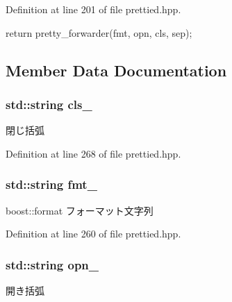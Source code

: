 \-Definition at line 201 of file prettied.\-hpp.


\begin{DoxyCode}
            {
                return pretty_forwarder(fmt, opn, cls, sep);
            }
\end{DoxyCode}


\subsection{\-Member \-Data \-Documentation}
\hypertarget{structyuh_1_1range__detail_1_1pretty__forwarder_ac1750e01b56a52147effe52c4e83e247}{
\subsubsection[{cls\-\_\-}]{\setlength{\rightskip}{0pt plus 5cm}std\-::string {\bf cls\-\_\-}}}\label{db/d79/structyuh_1_1range__detail_1_1pretty__forwarder_ac1750e01b56a52147effe52c4e83e247}
閉じ括弧 

\-Definition at line 268 of file prettied.\-hpp.

\hypertarget{structyuh_1_1range__detail_1_1pretty__forwarder_a5c63eb77f1b985d706bcb6dd96d0b0c4}{
\subsubsection[{fmt\-\_\-}]{\setlength{\rightskip}{0pt plus 5cm}std\-::string {\bf fmt\-\_\-}}}\label{db/d79/structyuh_1_1range__detail_1_1pretty__forwarder_a5c63eb77f1b985d706bcb6dd96d0b0c4}
boost\-::format フォーマット文字列 

\-Definition at line 260 of file prettied.\-hpp.

\hypertarget{structyuh_1_1range__detail_1_1pretty__forwarder_a551279ac03e367c8394c7e2b2c78aa3e}{
\subsubsection[{opn\-\_\-}]{\setlength{\rightskip}{0pt plus 5cm}std\-::string {\bf opn\-\_\-}}}\label{db/d79/structyuh_1_1range__detail_1_1pretty__forwarder_a551279ac03e367c8394c7e2b2c78aa3e}
開き括弧 


